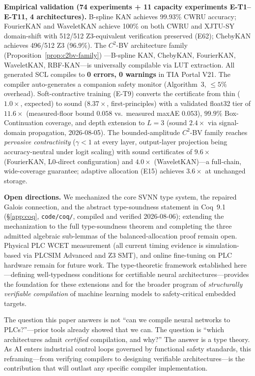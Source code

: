 \documentclass[journal,onecolumn]{IEEEtran}
\begin{document}
\vspace{4pt}
\noindent\textbf{Empirical validation (74 experiments + 11 capacity
experiments E-T1--E-T11, 4 architectures).}
B-spline KAN achieves 99.93\% CWRU accuracy; FourierKAN and WaveletKAN
achieve 100\% on both CWRU and XJTU-SY domain-shift with 512/512
Z3-equivalent verification preserved (E62); ChebyKAN achieves 496/512 Z3
(96.9\%). The $C^2$-BV architecture family (Proposition~\ref{prop:c2bv-family})
---B-spline KAN, ChebyKAN, FourierKAN, WaveletKAN, RBF-KAN---is universally
compilable via LUT extraction. All generated SCL compiles to
\textbf{0 errors, 0 warnings} in TIA Portal V21. The compiler auto-generates
a companion safety monitor (Algorithm~3, $\leq 5\%$ overhead).
Soft-contractive training (E-T9) converts the certificate from thin
($1.0\times$, expected) to sound ($8.37\times$, first-principles) with a
validated float32 tier of $11.6\times$ (measured-floor bound $0.058$
vs.\ measured maxAE $0.053$), $99.9\%$ Box-Continuation coverage, and
depth extension to $L{=}3$ (sound $2.4\times$ via signal-domain
propagation, 2026-08-05). The bounded-amplitude $C^2$-BV family reaches
\emph{pervasive contractivity} ($\gamma < 1$ at every layer, output-layer
projection being accuracy-neutral under logit scaling) with sound
certificates of $9.6\times$ (FourierKAN, L0-direct configuration) and
$4.0\times$ (WaveletKAN)---a full-chain, wide-coverage guarantee;
adaptive allocation (E15) achieves $3.6\times$ at unchanged storage.

\vspace{4pt}
\noindent\textbf{Open directions.} We mechanized the core SVNN type system,
the repaired Galois connection, and the abstract type-soundness statement
in Coq~9.1 ({\S}\ref{app:coq}, \texttt{code/coq/}, compiled and
verified 2026-08-06); extending the mechanization to the full
type-soundness theorem and completing the three admitted
algebraic sub-lemmas of the balanced-allocation proof remain open.
Physical PLC WCET measurement (all current timing
evidence is simulation-based via PLCSIM Advanced and Z3 SMT), and online fine-tuning
on PLC hardware remain for future work. The type-theoretic framework
established here---defining well-typedness conditions for certifiable
neural architectures---provides the foundation for these extensions and
for the broader program of \textit{structurally verifiable compilation}
of machine learning models to safety-critical embedded targets.

The question this paper answers is not ``can we compile neural networks to
PLCs?''---prior tools already showed that we can. The question is ``which
architectures admit \textit{certified} compilation, and why?'' The
answer is a type theory. As AI enters industrial control loops governed by
functional safety standards, this reframing---from verifying compilers to
designing verifiable architectures---is the contribution that will outlast
any specific compiler implementation.
\end{document}
